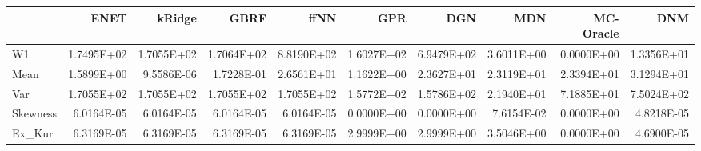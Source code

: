 \begin{tabular}{lrrrrrrrrr}
\toprule
{} &       ENET &     kRidge &       GBRF &       ffNN &        GPR &        DGN &        MDN &  MC-Oracle &        DNM \\
\midrule
W1       & 1.7495E+02 & 1.7055E+02 & 1.7064E+02 & 8.8190E+02 & 1.6027E+02 & 6.9479E+02 & 3.6011E+00 & 0.0000E+00 & 1.3356E+01 \\
Mean     & 1.5899E+00 & 9.5586E-06 & 1.7228E-01 & 2.6561E+01 & 1.1622E+00 & 2.3627E+01 & 2.3119E+01 & 2.3394E+01 & 3.1294E+01 \\
Var      & 1.7055E+02 & 1.7055E+02 & 1.7055E+02 & 1.7055E+02 & 1.5772E+02 & 1.5786E+02 & 2.1940E+01 & 7.1885E+01 & 7.5024E+02 \\
Skewness & 6.0164E-05 & 6.0164E-05 & 6.0164E-05 & 6.0164E-05 & 0.0000E+00 & 0.0000E+00 & 7.6154E-02 & 0.0000E+00 & 4.8218E-05 \\
Ex\_Kur   & 6.3169E-05 & 6.3169E-05 & 6.3169E-05 & 6.3169E-05 & 2.9999E+00 & 2.9999E+00 & 3.5046E+00 & 0.0000E+00 & 4.6900E-05 \\
\bottomrule
\end{tabular}
